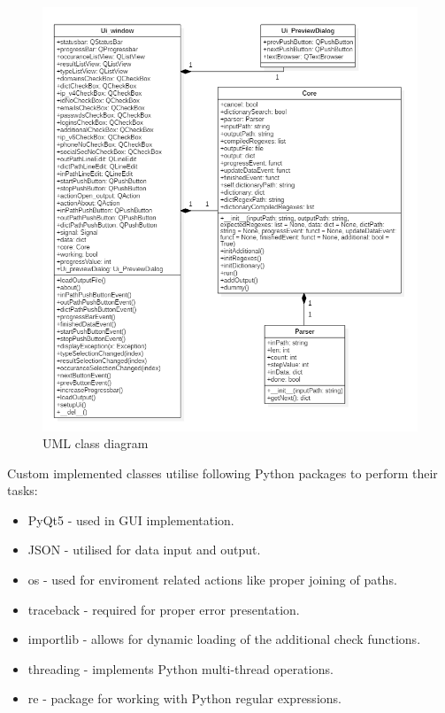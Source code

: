 \documentclass[a4paper,twoside,12pt]{book}
\begin{document}
\begin{figure}
   \centering
   \includegraphics{DiagramUML}
   \caption{UML class diagram}
   \label{fig:UMLdiagram}
\end{figure}

Custom implemented classes utilise following Python packages to perform their tasks: 

\begin{itemize}
   \item PyQt5 - used in GUI implementation.
   \item JSON - utilised for data input and output.
   \item os - used for enviroment related actions like proper joining of paths.
   \item traceback - required for proper error presentation.
   \item importlib - allows for dynamic loading of the additional check functions.
   \item threading - implements Python multi-thread operations.
   \item re - package for working with Python regular expressions.
\end{itemize}
\end{document}
